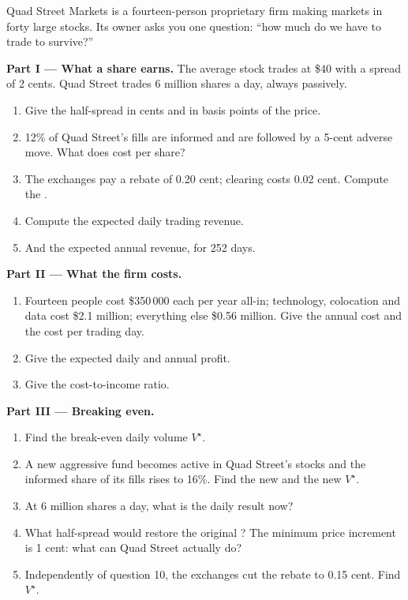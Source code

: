 \begin{problem}\label{pb:m1:what-a-trading-firm-does:1}
Quad Street Markets is a fourteen-person proprietary firm making markets in
forty large stocks. Its owner asks you one question: ``how much do we have to
trade to survive?''

\medskip\noindent\textbf{Part I --- What a share earns.} The average stock
trades at \$40 with a spread of 2 cents. Quad Street trades 6 million shares
a day, always passively.
\begin{enumerate}
\item Give the half-spread in cents and in basis points of the price.
\item 12\% of Quad Street's fills are informed and are followed by a 5-cent
adverse move. What does  cost per share?
\item The exchanges pay a rebate of 0.20 cent; clearing costs 0.02 cent.
Compute the .
\item Compute the expected daily trading revenue.
\item And the expected annual revenue, for 252 days.
\end{enumerate}

\medskip\noindent\textbf{Part II --- What the firm costs.}
\begin{enumerate}[resume]
\item Fourteen people cost \$350\,000 each per year all-in; technology,
colocation and data cost \$2.1 million; everything else \$0.56 million. Give
the annual cost and the cost per trading day.
\item Give the expected daily and annual profit.
\item Give the cost-to-income ratio.
\end{enumerate}

\medskip\noindent\textbf{Part III --- Breaking even.}
\begin{enumerate}[resume]
\item Find the break-even daily volume $V^\star$.
\item A new aggressive fund becomes active in Quad Street's stocks and the
informed share of its fills rises to 16\%. Find the new  and the
new $V^\star$.
\item At 6 million shares a day, what is the daily result now?
\item What half-spread would restore the original ? The minimum
price increment is 1 cent: what can Quad Street actually do?
\item Independently of question 10, the exchanges cut the rebate to 0.15
cent. Find $V^\star$.
\end{enumerate}


\end{problem}

